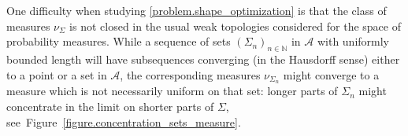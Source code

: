 One difficulty when studying \eqref{problem.shape_optimization} is that the class of measures $\nu_\Sigma$ is not closed in the usual weak topologies considered for the space of probability measures.
While a sequence of sets $(\Sigma_{n})_{n\in \mathbb{N}}$ in $\mathcal{A}$ with uniformly bounded length will have subsequences converging (in the Hausdorff sense) either to a point or a set in $\mathcal{A}$, the corresponding measures $\nu_{\Sigma_n}$ might converge to a measure which is not necessarily uniform on that set: longer parts of $\Sigma_n$ might concentrate in the limit on shorter parts of $\Sigma$, see~Figure~\ref{figure.concentration_sets_measure}.
\begin{figure}[t]
\centering

\end{figure}
